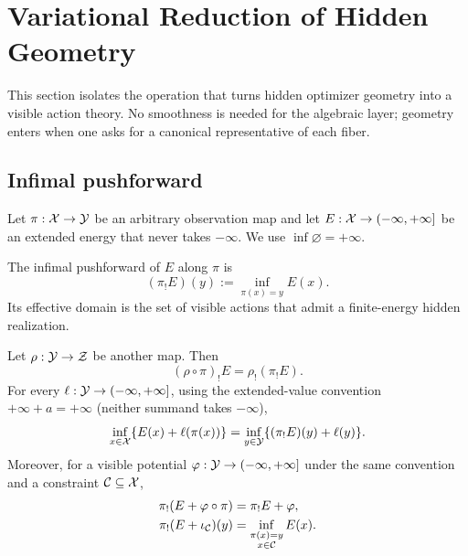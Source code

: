 \section{Variational Reduction of Hidden Geometry}
\label{sec:reduction}

This section isolates the operation that turns hidden optimizer geometry into
a visible action theory.  No smoothness is needed for the algebraic layer;
geometry enters when one asks for a canonical representative of each fiber.

\subsection{Infimal pushforward}

Let \(\pi:\mathcal X\to\mathcal Y\) be an arbitrary observation map and let
\(E:\mathcal X\to(-\infty,+\infty]\) be an extended energy that never takes
\(-\infty\).  We use \(\inf\varnothing=+\infty\).

\begin{definition}
\label{def:infimal-pushforward}
The infimal pushforward of \(E\) along \(\pi\) is
\begin{equation}
  (\pi_!E)(y)
  :=\inf_{\pi(x)=y}E(x).
  \label{eq:infimal-pushforward}
\end{equation}
Its effective domain is the set of visible actions that admit a finite-energy
hidden realization.
\end{definition}

\begin{theorem}
\label{thm:algebraic-reduction}
Let \(\rho:\mathcal Y\to\mathcal Z\) be another map.  Then
\begin{equation}
  (\rho\circ\pi)_!E=\rho_!(\pi_!E).
  \label{eq:pushforward-composition}
\end{equation}
For every \(\ell:\mathcal Y\to(-\infty,+\infty]\), using the extended-value
convention \(+\infty+a=+\infty\) (neither summand takes \(-\infty\)),
\begin{equation}
  \inf_{x\in\mathcal X}\{E(x)+\ell(\pi(x))\}
  =
  \inf_{y\in\mathcal Y}\{(\pi_!E)(y)+\ell(y)\}.
  \label{eq:task-reduction}
\end{equation}
Moreover, for a visible potential
\(\varphi:\mathcal Y\to(-\infty,+\infty]\) under the same convention and a
constraint \(\mathcal C\subseteq\mathcal X\),
\begin{align}
  \pi_!(E+\varphi\circ\pi)&=\pi_!E+\varphi,
  \label{eq:base-potential-law}\\
  \pi_!(E+\iota_{\mathcal C})(y)
  &=\inf_{\substack{\pi(x)=y\\x\in\mathcal C}}E(x).
  \label{eq:constraint-law}
\end{align}
\end{theorem}

